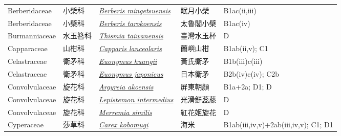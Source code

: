 {\begin{longtable}{p{2.5cm}p{2cm}p{5cm}p{2.5cm}p{3cm}}
    Berberidaceae & 小檗科 & \href{http://www.theplantlist.org/tpl1.1/search?q=Berberis+mingetsuensis}{\textit{Berberis mingetsuensis} } & 眠月小檗 & B1ac(ii,iii) \index{Berberis@\textit{Berberis}!mingetsuensis@\textit{mingetsuensis}}  \index{眠月小檗} \\
    Berberidaceae & 小檗科 & \href{http://www.theplantlist.org/tpl1.1/search?q=Berberis+tarokoensis}{\textit{Berberis tarokoensis} } & 太魯閣小檗 & B1ac(iv) \index{Berberis@\textit{Berberis}!tarokoensis@\textit{tarokoensis}}  \index{太魯閣小檗} \\
    Burmanniaceae & 水玉簪科 & \href{http://www.theplantlist.org/tpl1.1/search?q=Thismia+taiwanensis}{\textit{Thismia taiwanensis} } & 臺灣水玉杯 & D \index{Thismia@\textit{Thismia}!taiwanensis@\textit{taiwanensis}}  \index{臺灣水玉杯} \\
    Capparaceae & 山柑科 & \href{http://www.theplantlist.org/tpl1.1/search?q=Capparis+lanceolaris}{\textit{Capparis lanceolaris} } & 蘭嶼山柑 & B1ab(ii,v); C1 \index{Capparis@\textit{Capparis}!lanceolaris@\textit{lanceolaris}}  \index{蘭嶼山柑} \\
    Celastraceae & 衛矛科 & \href{http://www.theplantlist.org/tpl1.1/search?q=Euonymus+huangii}{\textit{Euonymus huangii} } & 黃氏衛矛 & B1b(iii)c(iii) \index{Euonymus@\textit{Euonymus}!huangii@\textit{huangii}}  \index{黃氏衛矛} \\
    Celastraceae & 衛矛科 & \href{http://www.theplantlist.org/tpl1.1/search?q=Euonymus+japonicus}{\textit{Euonymus japonicus} } & 日本衛矛 & B2b(iv)c(iv); C2b \index{Euonymus@\textit{Euonymus}!japonicus@\textit{japonicus}}  \index{日本衛矛} \\
    Convolvulaceae & 旋花科 & \href{http://www.theplantlist.org/tpl1.1/search?q=Argyreia+akoensis}{\textit{Argyreia akoensis} } & 屏東朝顏 & B1a+2a; D1; D \index{Argyreia@\textit{Argyreia}!akoensis@\textit{akoensis}}  \index{屏東朝顏} \\
    Convolvulaceae & 旋花科 & \href{http://www.theplantlist.org/tpl1.1/search?q=Lepistemon+intermedius}{\textit{Lepistemon intermedius} } & 光滑鮮蕊藤 & D \index{Lepistemon@\textit{Lepistemon}!intermedius@\textit{intermedius}}  \index{光滑鮮蕊藤} \\
    Convolvulaceae & 旋花科 & \href{http://www.theplantlist.org/tpl1.1/search?q=Merremia+similis}{\textit{Merremia similis} } & 紅花姬旋花 & D \index{Merremia@\textit{Merremia}!similis@\textit{similis}}  \index{紅花姬旋花} \\
    Cyperaceae & 莎草科 & \href{http://www.theplantlist.org/tpl1.1/search?q=Carex+kobomugi}{\textit{Carex kobomugi} } & 海米 & B1ab(iii,iv,v)+2ab(iii,iv,v); C1; D1 \index{Carex@\textit{Carex}!kobomugi@\textit{kobomugi}}  \index{海米} \\

\end{longtable}}
